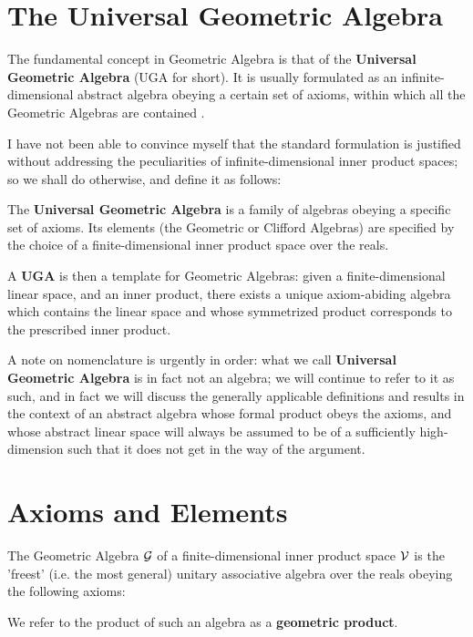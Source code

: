 \section{The Universal Geometric Algebra}

The fundamental concept in Geometric Algebra is that of the \textbf{Universal Geometric Algebra} (UGA for short). It is usually formulated as an infinite-dimensional abstract algebra obeying a certain set of axioms, within which all the Geometric Algebras are contained \cite{ga-origin}. 

I have not been able to convince myself that the standard formulation is justified without addressing the peculiarities of infinite-dimensional inner product spaces; so we shall do otherwise, and define it as follows:
\begin{definition}
	The \textbf{Universal Geometric Algebra} is a family of algebras obeying a specific set of axioms. Its elements (the Geometric or Clifford Algebras) are specified by the choice of a finite-dimensional inner product space over the reals.
\end{definition}

A \textbf{UGA} is then a template for Geometric Algebras: given a finite-dimensional linear space, and an inner product, there exists a unique axiom-abiding algebra which contains the linear space and whose symmetrized product corresponds to the prescribed inner product.

A note on nomenclature is urgently in order: what we call \textbf{Universal Geometric Algebra} is in fact not an algebra; we will continue to refer to it as such, and in fact we will discuss the generally applicable definitions and results in the context of an abstract algebra whose formal product obeys the axioms, and whose abstract linear space will always be assumed to be of a sufficiently high-dimension such that it does not get in the way of the argument.

\newpage

\section{Axioms and Elements}

The Geometric Algebra $\mathcal{G}$ of a finite-dimensional inner product space $\mathcal{V}$ is the 'freest' (i.e. the most general) unitary associative algebra over the reals obeying the following axioms:

We refer to the product of such an algebra as a \textbf{geometric product}.

